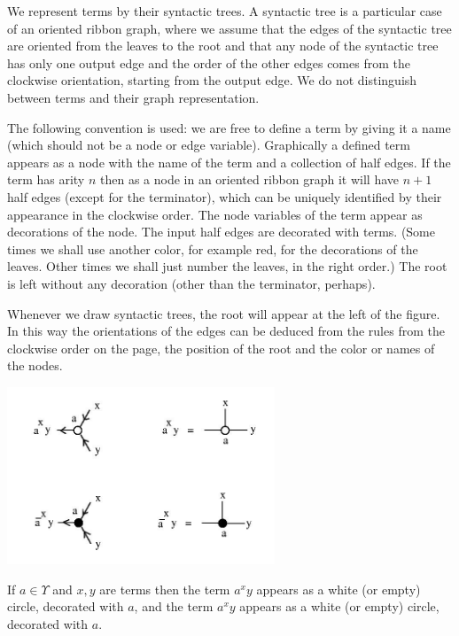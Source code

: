 \documentclass{article}
\begin{document}
We represent terms by their syntactic trees. A syntactic tree is a particular case of an oriented ribbon graph, where we assume that the edges of the syntactic tree are oriented from the leaves to the root and that any node of the syntactic tree has only one output edge and the order of the other edges comes from the clockwise orientation, starting from the output edge. We do not distinguish between terms and their graph representation. 





The following convention is used: we are free to define a term by giving it a name (which should not be a node or edge variable). Graphically a defined term appears as a node with the name of the term and a collection of half edges. If the term has arity $n$ then as a node in an oriented ribbon graph it will have $n+1$ half edges (except for the terminator), which can be uniquely identified by their  appearance in the clockwise order. The node variables of the term appear as decorations of the node. The input half edges are decorated with terms. (Some times we shall use another color, for example red, for the decorations of the leaves. Other times we shall just number the leaves, in the right order.) The root is left without any decoration (other than the terminator, perhaps). 

Whenever we draw syntactic trees, the root will appear at the left of the figure. In this way the orientations of the edges can be deduced from the rules from the clockwise order on the page, the position of the root and the color or names of the nodes. 

\vspace{.5cm} 
\centerline{\includegraphics[width=80mm]{jpg/shuffle_00.jpg}} \vspace{.5cm} 

If $a \in \Upsilon$ and $x , y$ are terms then the term $\displaystyle a^{x}y$ appears as a white (or empty) circle, decorated with $a$, and the term $\displaystyle a^{x}y$ appears as a white (or empty) circle, decorated with $a$. 
\end{document}
